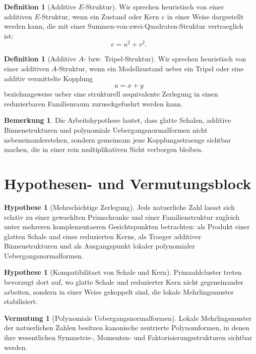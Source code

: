 \documentclass[11pt,a4paper]{article}
\theoremstyle{definition}
\newtheorem{definition}[satz]{Definition}
\newtheorem{bemerkung}[satz]{Bemerkung}
\newtheorem{hypothese}[satz]{Hypothese}
\newtheorem{vermutung}[satz]{Vermutung}
\begin{document}
\begin{definition}[Additive \(E\)-Struktur]
Wir sprechen heuristisch von einer additiven \(E\)-Struktur, wenn ein Zustand oder Kern \(e\) in einer Weise dargestellt werden kann, die mit einer Summen-von-zwei-Quadraten-Struktur vertraeglich ist:
\[
e=u^2+v^2.
\]
\end{definition}

\begin{definition}[Additive \(A\)- bzw. Tripel-Struktur]
Wir sprechen heuristisch von einer additiven \(A\)-Struktur, wenn ein Modellzustand ueber ein Tripel oder eine additiv vermittelte Kopplung
\[
a=x+y
\]
beziehungsweise ueber eine strukturell aequivalente Zerlegung in einen reduzierbaren Familienraum zurueckgefuehrt werden kann.
\end{definition}

\begin{bemerkung}
Die Arbeitshypothese lautet, dass glatte Schalen, additive Binnenstrukturen und polynomiale Uebergangsnormalformen nicht nebeneinanderstehen, sondern gemeinsam jene Kopplungsstraenge sichtbar machen, die in einer rein multiplikativen Sicht verborgen bleiben.
\end{bemerkung}

\section{Hypothesen- und Vermutungsblock}

\begin{hypothese}[Mehrschichtige Zerlegung]
Jede natuerliche Zahl laesst sich relativ zu einer gewaehlten Primschranke und einer Familienstruktur zugleich unter mehreren komplementaeren Gesichtspunkten betrachten: als Produkt einer glatten Schale und eines reduzierten Kerns, als Traeger additiver Binnenstrukturen und als Ausgangspunkt lokaler polynomialer Uebergangsnormalformen.
\end{hypothese}

\begin{hypothese}[Kompatibilitaet von Schale und Kern]
Primzahlcluster treten bevorzugt dort auf, wo glatte Schale und reduzierter Kern nicht gegeneinander arbeiten, sondern in einer Weise gekoppelt sind, die lokale Mehrlingsmuster stabilisiert.
\end{hypothese}

\begin{vermutung}[Polynomiale Uebergangsnormalformen]
Lokale Mehrlingsmuster der natuerlichen Zahlen besitzen kanonische zentrierte Polynomformen, in denen ihre wesentlichen Symmetrie-, Momenten- und Faktorisierungsstrukturen sichtbar werden.
\end{vermutung}
\end{document}
